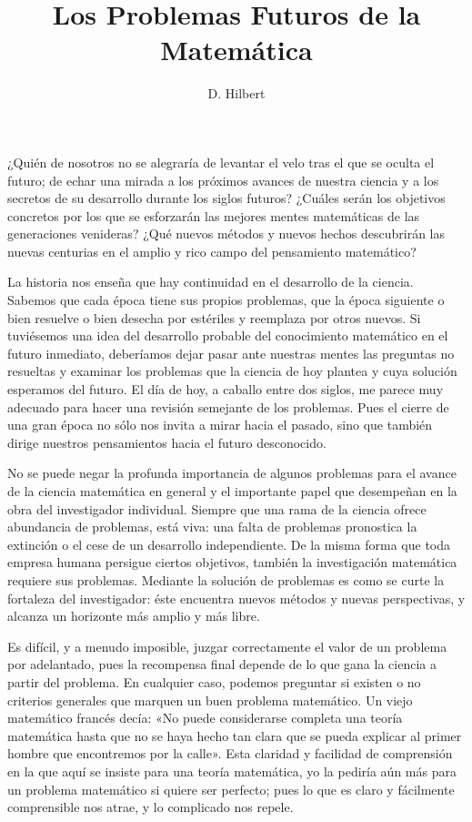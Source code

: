 \documentclass[a4paper, 12pt]{article}
\title{Los Problemas Futuros de la Matemática}
\author{D. Hilbert}
\date{}
\begin{document}
\begin{tcolorbox}[colback=blue!5!white,colframe=blue!75!black]

\vspace{-1.8cm}
\textbf \maketitle

\end{tcolorbox}

\bigskip


¿Quién de nosotros no se alegraría de levantar el velo tras el que se oculta el futuro; de echar una mirada a los próximos avances de nuestra ciencia y a los secretos de su desarrollo durante los siglos futuros? ¿Cuáles serán los objetivos concretos por los que se esforzarán las mejores mentes matemáticas de las generaciones venideras? ¿Qué nuevos métodos y nuevos hechos descubrirán las nuevas centurias en el amplio y rico campo del pensamiento matemático? 

La historia nos enseña que hay continuidad en el desarrollo de la ciencia. Sabemos que cada época tiene sus propios problemas, que la época siguiente o bien resuelve o bien desecha por estériles y reemplaza por otros nuevos. Si tuviésemos una idea del desarrollo probable del conocimiento matemático en el futuro inmediato, deberíamos dejar pasar ante nuestras mentes las preguntas no resueltas y examinar los problemas que la ciencia de hoy plantea y cuya solución esperamos del futuro. El día de hoy, a caballo entre dos siglos, me parece muy adecuado para hacer una revisión semejante de los problemas. Pues el cierre de una gran época no sólo nos invita a mirar hacia el pasado, sino que también dirige nuestros pensamientos hacia el futuro desconocido. 

No se puede negar la profunda importancia de algunos problemas para el avance de la ciencia matemática en general y el importante papel que desempeñan en la obra del investigador individual. Siempre que una rama de la ciencia ofrece abundancia de problemas, está viva: una falta de problemas pronostica la extinción o el cese de un desarrollo independiente. De la misma forma que toda empresa humana persigue ciertos objetivos, también la investigación matemática requiere sus problemas. Mediante la solución de problemas es como se curte la fortaleza del investigador: éste encuentra nuevos métodos y nuevas perspectivas, y alcanza un horizonte más amplio y más libre. 

Es difícil, y a menudo imposible, juzgar correctamente el valor de un problema por adelantado, pues la recompensa final depende de lo que gana la ciencia a partir del problema. En cualquier caso, podemos preguntar si existen o no criterios generales que marquen un buen problema matemático. Un viejo matemático francés decía: «No puede considerarse completa una teoría matemática hasta que no se haya hecho tan clara que se pueda explicar al primer hombre que encontremos por la calle». Esta claridad y facilidad de comprensión en la que aquí se insiste para una teoría matemática, yo la pediría aún más para un problema matemático si quiere ser perfecto; pues lo que es claro y fácilmente comprensible nos atrae, y lo complicado nos repele. 
\end{document}
